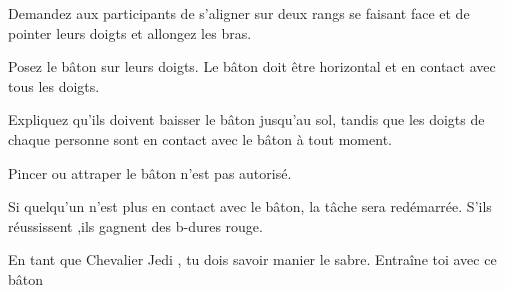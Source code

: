 \documentclass{grand-jeu}
\begin{document}
\begin{liste-materiel}
\end{liste-materiel}

\begin{regles}
Demandez aux participants de s’aligner sur deux rangs se faisant face et de pointer leurs doigts et allongez les bras.

Posez le bâton sur leurs doigts. Le bâton doit être horizontal et en contact avec tous les doigts.

Expliquez qu’ils doivent baisser le bâton jusqu’au sol, tandis que les doigts de chaque personne sont en contact avec le bâton à tout moment.

Pincer ou attraper le bâton n’est pas autorisé.

Si quelqu’un n’est plus en contact avec le bâton, la tâche sera redémarrée.
S'ils réussissent ,ils gagnent des b-dures rouge.
\end{regles}

\begin{imaginaire}

En tant que Chevalier Jedi , tu dois savoir manier le sabre. Entraîne toi avec ce bâton  


\end{imaginaire}


\begin{moments-stop}
\end{moments-stop}
\end{document}
